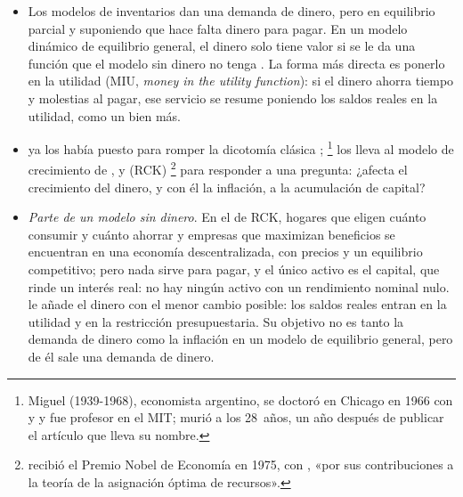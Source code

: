 \documentclass[11pt]{article}
\begin{document}
\begin{itemize}
\item Los modelos de inventarios dan una demanda de dinero, pero en equilibrio parcial y suponiendo que hace falta dinero para pagar. En un modelo dinámico de equilibrio general, el dinero solo tiene valor si se le da una función que el modelo sin dinero no tenga . La forma más directa es ponerlo en la utilidad (MIU, \emph{money in the utility function}): si el dinero ahorra tiempo y molestias al pagar, ese servicio se resume poniendo los saldos reales en la utilidad, como un bien más.
\item \textcite{Patinkin1956Money} ya los había puesto para romper la dicotomía clásica ; \textcite{Sidrauski1967Rational}\footnote{Miguel  (1939-1968), economista argentino, se doctoró en Chicago en 1966 con  y  y fue profesor en el MIT; murió a los 28~años, un año después de publicar el artículo que lleva su nombre.} los lleva al modelo de crecimiento de ,  y  (RCK) \footnote{ recibió el Premio Nobel de Economía en 1975, con , «por sus contribuciones a la teoría de la asignación óptima de recursos»\nocite{NobelPrize1975Koopmans}.} para responder a una pregunta: ¿afecta el crecimiento del dinero, y con él la inflación, a la acumulación de capital?
\item \emph{Parte de un modelo sin dinero}. En el de RCK, hogares que eligen cuánto consumir y cuánto ahorrar y empresas que maximizan beneficios se encuentran en una economía descentralizada, con precios y un equilibrio competitivo; pero nada sirve para pagar, y el único activo es el capital, que rinde un interés real: no hay ningún activo con un rendimiento nominal nulo.  le añade el dinero con el menor cambio posible: los saldos reales entran en la utilidad y en la restricción presupuestaria. Su objetivo no es tanto la demanda de dinero como la inflación en un modelo de equilibrio general, pero de él sale una demanda de dinero.
\end{itemize}
\end{document}
